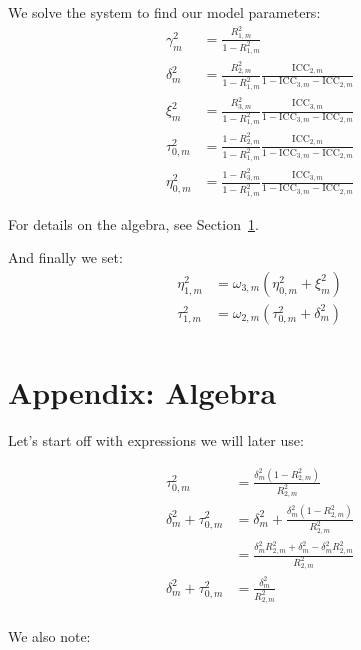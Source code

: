 \documentclass[12pt]{article}
\begin{document}
We solve the system to find our model parameters:
\begin{align*}
\gamma_m^2 &= \frac{R_{1,m}^2}{1 - R_{1,m}^2}\\
\delta_m^2 &= \frac{R_{2,m}^2}{1-R_{1,m}^2} \frac{\text{ICC}_{2,m}}{1 - \text{ICC}_{3,m}- \text{ICC}_{2,m}}\\
\xi_m^2 &= \frac{R_{3,m}^2}{1-R_{1,m}^2} \frac{\text{ICC}_{3,m}}{1 - \text{ICC}_{3,m}- \text{ICC}_{2,m}}\\
\tau^2_{0,m}  &= \frac{1-R_{2,m}^2}{1-R_{1,m}^2} \frac{\text{ICC}_{2,m}}{1 - \text{ICC}_{3,m}- \text{ICC}_{2,m}}\\ 
\eta^2_{0,m} &= \frac{1-R_{3,m}^2}{1-R_{1,m}^2}\frac{\text{ICC}_{3,m}}{1 - \text{ICC}_{3,m}- \text{ICC}_{2,m}}
\end{align*}

For details on the algebra, see Section~\ref{sec:alg}.

And finally we set:
\begin{align*}
\eta^2_{1,m} &= \omega_{3,m} \left(\eta^2_{0,m} + \xi^2_m\right) \\
\tau^2_{1,m} &= \omega_{2,m} \left(\tau^2_{0,m} + \delta_m^2\right) \\
\end{align*}


\section{Appendix: Algebra}
\label{sec:alg}

Let's start off with expressions we will later use:

\begin{align*}
\tau^2_{0,m}  &= \frac{\delta_m^2(1 - R_{2,m}^2)}{R_{2,m}^2}\\
\delta_m^2 + \tau^2_{0,m}  &= \delta_m^2 + \frac{\delta_m^2(1 - R_{2,m}^2)}{R_{2,m}^2}\\
&= \frac{\delta_m^2R_{2,m}^2 + \delta_m^2 - \delta_m^2R_{2,m}^2}{R_{2,m}^2}\\
\delta_m^2 + \tau^2_{0,m} &= \frac{\delta_m^2}{R_{2,m}^2}\\
\end{align*}

We also note:
\end{document}
